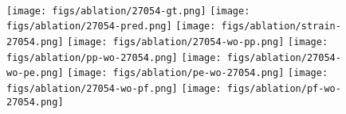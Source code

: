 \begin{figure}[htbp]
    \centering
    \begin{graybox}
    \hspace{0.2cm}
    \hspace{0.2cm}
    \hspace{0.2cm}
    \hspace{0.2cm}
    \\
    \texttt{[image: figs/ablation/27054-gt.png]}\hspace{0.2cm}
    \texttt{[image: figs/ablation/27054-pred.png]}\hspace{0.02cm}
    \texttt{[image: figs/ablation/strain-27054.png]}\hspace{0.2cm}
    \texttt{[image: figs/ablation/27054-wo-pp.png]}\hspace{0.02cm}
    \texttt{[image: figs/ablation/pp-wo-27054.png]}\hspace{0.2cm}
    \texttt{[image: figs/ablation/27054-wo-pe.png]}\hspace{0.02cm}
    \texttt{[image: figs/ablation/pe-wo-27054.png]}\hspace{0.2cm}
    \texttt{[image: figs/ablation/27054-wo-pf.png]}\hspace{0.02cm}
    \texttt{[image: figs/ablation/pf-wo-27054.png]}
    \\
    \footnotesize{
    \hspace{0.2cm}
    \hspace{0.02cm}
    \hspace{0.2cm}
    \hspace{0.02cm}
    \hspace{0.2cm}
    \hspace{0.02cm}
    \hspace{0.02cm}
    }

\end{graybox}
\end{figure}
